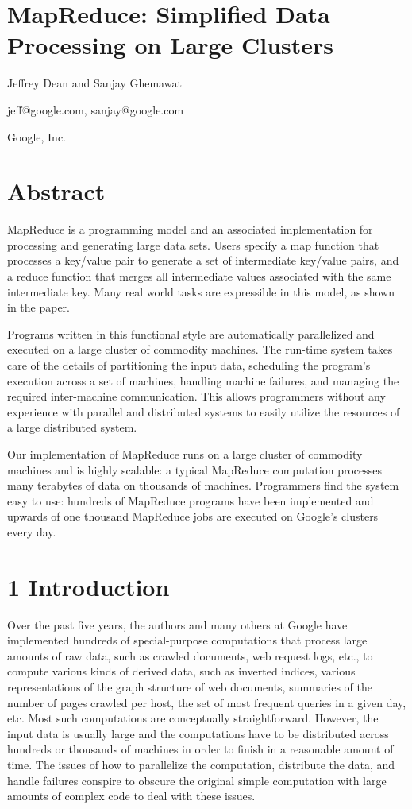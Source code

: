 \documentclass[
]{article}
\author{}
\date{}
\begin{document}
\section{MapReduce: Simplified Data Processing on Large
Clusters}\label{mapreduce-simplified-data-processing-on-large-clusters}

Jeffrey Dean and Sanjay Ghemawat

jeff@google.com, sanjay@google.com

Google, Inc.

\section{Abstract}\label{abstract}

MapReduce is a programming model and an associated implementation for
processing and generating large data sets. Users specify a map function
that processes a key/value pair to generate a set of intermediate
key/value pairs, and a reduce function that merges all intermediate
values associated with the same intermediate key. Many real world tasks
are expressible in this model, as shown in the paper.

Programs written in this functional style are automatically parallelized
and executed on a large cluster of commodity machines. The run-time
system takes care of the details of partitioning the input data,
scheduling the program's execution across a set of machines, handling
machine failures, and managing the required inter-machine communication.
This allows programmers without any experience with parallel and
distributed systems to easily utilize the resources of a large
distributed system.

Our implementation of MapReduce runs on a large cluster of commodity
machines and is highly scalable: a typical MapReduce computation
processes many terabytes of data on thousands of machines. Programmers
find the system easy to use: hundreds of MapReduce programs have been
implemented and upwards of one thousand MapReduce jobs are executed on
Google's clusters every day.

\section{1 Introduction}\label{introduction}

Over the past five years, the authors and many others at Google have
implemented hundreds of special-purpose computations that process large
amounts of raw data, such as crawled documents, web request logs, etc.,
to compute various kinds of derived data, such as inverted indices,
various representations of the graph structure of web documents,
summaries of the number of pages crawled per host, the set of most
frequent queries in a given day, etc. Most such computations are
conceptually straightforward. However, the input data is usually large
and the computations have to be distributed across hundreds or thousands
of machines in order to finish in a reasonable amount of time. The
issues of how to parallelize the computation, distribute the data, and
handle failures conspire to obscure the original simple computation with
large amounts of complex code to deal with these issues.
\end{document}
